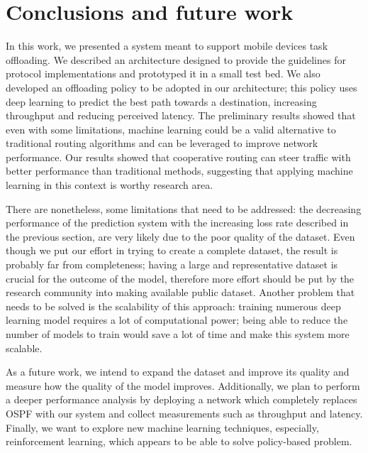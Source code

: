 \chapter{Conclusions and future work}\label{ch:conclusion}
In this work, we presented a system meant to support mobile devices task offloading. We described an architecture designed to provide the guidelines for protocol implementations and prototyped it in a small test bed. We also developed an offloading policy to be adopted in our architecture; this policy uses deep learning to predict the best path towards a destination, increasing throughput and reducing perceived latency. The preliminary results showed that even with some limitations, machine learning could be a valid alternative to traditional routing algorithms and can be leveraged to improve network performance. Our results showed that cooperative routing can steer traffic with better performance than traditional methods, suggesting that applying machine learning in this context is worthy research area. 

There are nonetheless, some limitations that need to be addressed: the decreasing performance of the prediction system with the increasing loss rate described in the previous section, are very likely due to the poor quality of the dataset. Even though we put our effort in trying to create a complete dataset, the result is probably far from completeness; having a large and representative dataset is crucial for the outcome of the model, therefore more effort should be put by the research community into making available public dataset. Another problem that needs to be solved is the scalability of this approach: training numerous deep learning model requires a lot of computational power; being able to reduce the number of models to train would save a lot of time and make this system more scalable.

As a future work, we intend to expand the dataset and improve its quality and measure how the quality of the model improves. Additionally, we plan to perform a deeper performance analysis by deploying a network which completely replaces OSPF with our system and collect measurements such as throughput and latency. Finally, we want to explore new machine learning techniques, especially, reinforcement learning, which appears to be able to solve policy-based problem.